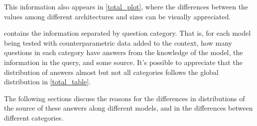 This information also appears in \cref{total_plot}, where the differences between the values among different architectures and sizes can be visually appreciated.

 contains the information separated by question category.
That is, for each model being tested with counterparametric data added to the context, how many questions in each category have answers from the \Parametric{} knowledge of the model, the \Contextual{} information in the query, and some \Other{} source.
It's possible to appreciate that the distribution of answers almost but not all categories follows the global distribution in \cref{total_table}.

The following sections discuss the reasons for the differences in distributions of the source of these answers along different models, and in the differences between different categories.
